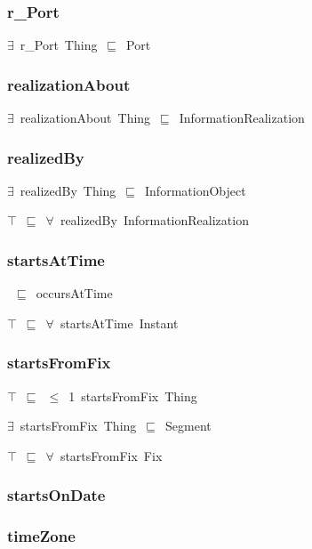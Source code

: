 \documentclass{article}
\begin{document}
\subsubsection*{r\_Port}

\ensuremath{\exists}~r\_Port~Thing~\ensuremath{\sqsubseteq}~Port

\subsubsection*{realizationAbout}

\ensuremath{\exists}~realizationAbout~Thing~\ensuremath{\sqsubseteq}~InformationRealization

\subsubsection*{realizedBy}

\ensuremath{\exists}~realizedBy~Thing~\ensuremath{\sqsubseteq}~InformationObject

\ensuremath{\top}~\ensuremath{\sqsubseteq}~\ensuremath{\forall}~realizedBy~InformationRealization

\subsubsection*{startsAtTime}

~\ensuremath{\sqsubseteq}~occursAtTime

\ensuremath{\top}~\ensuremath{\sqsubseteq}~\ensuremath{\forall}~startsAtTime~Instant

\subsubsection*{startsFromFix}

\ensuremath{\top}~\ensuremath{\sqsubseteq}~\ensuremath{\leq}~1~startsFromFix~Thing

\ensuremath{\exists}~startsFromFix~Thing~\ensuremath{\sqsubseteq}~Segment

\ensuremath{\top}~\ensuremath{\sqsubseteq}~\ensuremath{\forall}~startsFromFix~Fix

\subsubsection*{startsOnDate}

\subsubsection*{timeZone}
\end{document}
